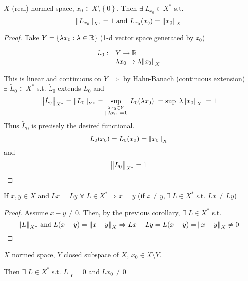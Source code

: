 \begin{corollary}
    \(X\) (real) normed space, \(x_0 \in X \setminus \left\{ 0 \right\}\).
    Then \(\exists \; L_{x_0} \in X^*\) s.t. 
    \[
        \norm{L_{x_0}}_{X^*} = 1 \mbox{ and } L_{x_0}(x_0) = \norm{x_0}_X
    \]
\end{corollary}
\begin{proof}
    Take \(Y = \left\{ \lambda x_0 : \lambda \in \mathbb{R} \right\}\) (1-d vector space generated by \(x_0\))  
    
    \[
        \begin{array}{rl}
            L_0: & Y \to \mathbb{R} \\
            & \lambda x_0 \mapsto \lambda \norm{x_0}_X
        \end{array}    
    \]

    This is linear and continuous on \(Y\) \(\Rightarrow\) by Hahn-Banach (continuous extension) \(\exists \; \tilde{L}_0 \in X^*\) s.t. \(\tilde{L}_0\) extends \(L_0\) and 
    \[
        \norm{\tilde{L}_0}_{X^*} = \norm{L_0}_{Y^*} = \sup_{\substack{\lambda x_0 \in Y \\ \norm{\lambda x_0} = 1}}\abs{L_0(\lambda x_0)}= \sup \abs{\lambda \norm{x_0}_X} = 1
    \]
    Thus \(\tilde{L}_0\) is precisely the desired functional.
    \[
        \tilde{L}_0 (x_0) = L_0(x_0) = \norm{x_0}_X
    \]
    and 
    \[
        \norm{\tilde{L}_0}_{X^*} = 1
    \]
\end{proof}
\begin{corollary}
    If \(x,y \in X\) and \(Lx = Ly\) \(\forall \; L \in X^* \Rightarrow x = y\) (if \(x \neq y, \exists \; L \in X^*\) s.t. \(Lx \neq Ly\))
\end{corollary}
\begin{proof}
    Assume \(x-y \neq 0\). Then, by the previous corollary, \(\exists \; L \in X^*\) s.t. 
    \[
        \norm{L}_{X^*} \mbox{ and } L(x-y) = \norm{x-y}_X \Rightarrow Lx -Ly = L(x-y) = \norm{x-y}_X \neq 0
    \]
\end{proof}
\begin{corollary}
    \(X\) normed space, \(Y\) closed subspace of \(X\), \(x_0 \in X \setminus Y\). 

    Then \(\exists \; L \in X^*\) s.t. \(L\vert_Y = 0\) and \(L{x_0} \neq 0\)
\end{corollary}
